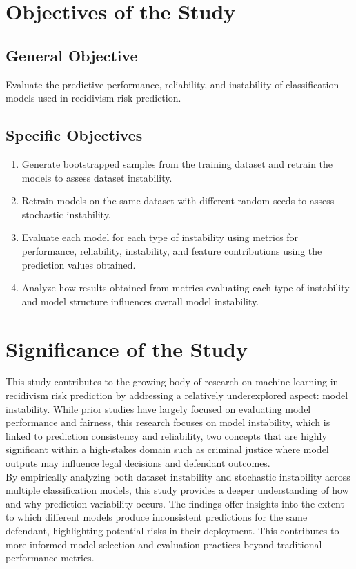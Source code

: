 \documentclass[12pt]{article}
\begin{document}
\section{Objectives of the Study} 
\subsection{General Objective} Evaluate the predictive performance, reliability, and instability of classification models used in recidivism risk prediction.
\subsection{Specific Objectives}
\begin{enumerate}
  \item Generate bootstrapped samples from the training dataset and retrain the models to assess dataset instability.
  \item Retrain models on the same dataset with different random seeds to assess stochastic instability.
  \item Evaluate each model for each type of instability using metrics for performance, reliability, instability, and feature contributions using the prediction values obtained. 
  \item Analyze how results obtained from metrics evaluating each type of instability and model structure influences overall model instability. 
\end{enumerate}

\section{Significance of the Study}
\tab This study contributes to the growing body of research on machine learning in recidivism risk prediction by addressing a relatively underexplored aspect: model instability. While prior studies have largely focused on evaluating model performance and fairness, this research focuses on model instability, which is linked to prediction consistency and reliability, two concepts that are highly significant within a high-stakes domain such as criminal justice where model outputs may influence legal decisions and defendant outcomes.\\

By empirically analyzing both dataset instability and stochastic instability across multiple classification models, this study provides a deeper understanding of how and why prediction variability occurs. The findings offer insights into the extent to which different models produce inconsistent predictions for the same defendant, highlighting potential risks in their deployment. This contributes to more informed model selection and evaluation practices beyond traditional performance metrics.\\
\end{document}
